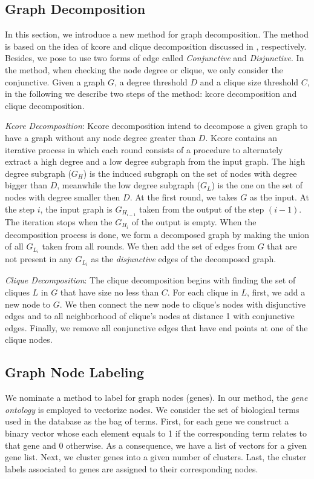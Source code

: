 \documentclass{esannV2}
\begin{document}
\subsection{Graph Decomposition}
In this section, we introduce a new method for graph decomposition. The method is based on the idea of kcore and clique decomposition discussed in \cite{kcore}, \cite{clique} respectively. Besides, we pose to use two forms of edge called \textit{Conjunctive} and \textit{Disjunctive}. In the method, when checking the node degree or clique, we only consider the conjunctive. Given a graph $G$, a degree threshold $D$ and a clique size threshold $C$, in the following we describe two steps of the method: kcore decomposition and clique decomposition.

\textit{Kcore Decomposition}: Kcore decomposition intend to decompose a given graph to have a graph without any node degree greater than $D$. Kcore contains an iterative process in which each round consists of a procedure to alternately extract a high degree and a low degree subgraph from the input graph. The high degree subgraph ($G_H$) is the induced subgraph on the set of nodes with degree bigger than $D$, meanwhile the low degree subgraph ($G_L$) is the one on the set of nodes with degree smaller then $D$. At the first round, we takes $G$ as the input. At the step $i$, the input graph is $G_{H_{i-1}}$ taken from the output 
of the step $(i-1)$. The iteration stops when the $G_{H_{i}}$ of the output is empty. When the decomposition process is done, we form a decomposed graph by making the union of all $G_{L_{i}}$ taken from all rounds. We then add the set of edges from $G$ that are not present in any $G_{L_{i}}$ as the \textit{disjunctive} edges of the decomposed graph. 

\textit{Clique Decomposition}: The clique decomposition begins with finding the set of cliques $L$ in $G$ that have size no less than $C$. For each clique in $L$, first, we add a new node to $G$. We then connect the new node to clique's nodes with disjunctive edges and to all neighborhood of clique's nodes at distance 1 with conjunctive edges. Finally, we remove all conjunctive edges that have end points at one of the clique nodes.
\subsection{Graph Node Labeling}
We nominate a method to label for graph nodes (genes). In our method, the \textit{gene ontology} \cite{ontology} is employed to vectorize nodes. We consider the set of biological terms used in the database as the bag of terms. First, for each gene we construct a binary vector whose each element equals to 1 if the corresponding term relates to that gene and 0 otherwise. As a consequence, we have a list of vectors for a given gene list. Next, we cluster genes into a given number of clusters. Last, the cluster labels associated to genes are assigned to their corresponding nodes.
\end{document}
